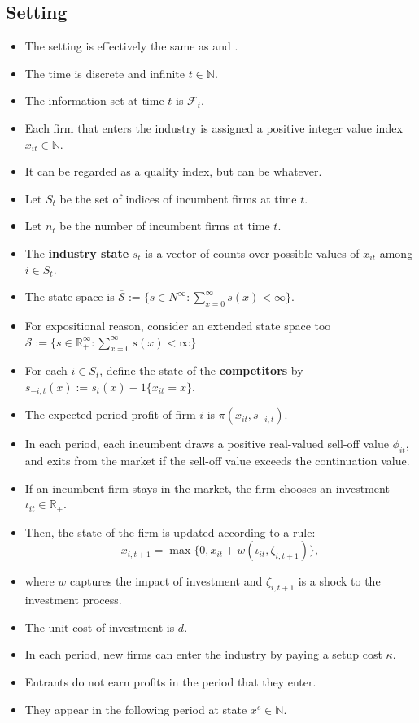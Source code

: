 \documentclass[]{book}
\providecommand{\tightlist}{%
  \setlength{\itemsep}{0pt}\setlength{\parskip}{0pt}}
\begin{document}
\subsection{Setting}\label{setting-4}

\begin{itemize}
\tightlist
\item
  The setting is effectively the same as
  \citet{ericsonMarkovPerfectIndustryDynamics1995} and
  \citet{doraszelskiComputableMarkovperfectIndustry2010}.
\item
  The time is discrete and infinite \(t \in \mathbb{N}\).
\item
  The information set at time \(t\) is \(\mathcal{F}_t\).
\item
  Each firm that enters the industry is assigned a positive integer
  value index \(x_{it} \in \mathbb{N}\).
\item
  It can be regarded as a quality index, but can be whatever.
\item
  Let \(S_t\) be the set of indices of incumbent firms at time \(t\).
\item
  Let \(n_t\) be the number of incumbent firms at time \(t\).
\item
  The \textbf{industry state} \(s_t\) is a vector of counts over
  possible values of \(x_{it}\) among \(i \in S_t\).
\item
  The state space is
  \(\overline{\mathcal{S}} := \{s \in N^{\infty}: \sum_{x = 0}^\infty s(x) < \infty\}\).
\item
  For expositional reason, consider an extended state space too
  \(\mathcal{S} := \{s \in \mathbb{R}_+^{\infty}: \sum_{x = 0}^\infty s(x) < \infty\}\)
\item
  For each \(i \in S_{t}\), define the state of the \textbf{competitors}
  by \(s_{-i, t}(x) := s_t(x) - 1\{x_{it} = x\}\).
\item
  The expected period profit of firm \(i\) is
  \(\pi(x_{it}, s_{-i, t})\).
\item
  In each period, each incumbent draws a positive real-valued sell-off
  value \(\phi_{it}\), and exits from the market if the sell-off value
  exceeds the continuation value.
\item
  If an incumbent firm stays in the market, the firm chooses an
  investment \(\iota_{it} \in \mathbb{R}_+\).
\item
  Then, the state of the firm is updated according to a rule: \[
  x_{i, t + 1} = \max\{0, x_{it} + w(\iota_{it}, \zeta_{i, t + 1})\},
  \]
\item
  where \(w\) captures the impact of investment and \(\zeta_{i, t + 1}\)
  is a shock to the investment process.
\item
  The unit cost of investment is \(d\).
\item
  In each period, new firms can enter the industry by paying a setup
  cost \(\kappa\).
\item
  Entrants do not earn profits in the period that they enter.
\item
  They appear in the following period at state \(x^e \in \mathbb{N}\).
\end{itemize}
\end{document}
